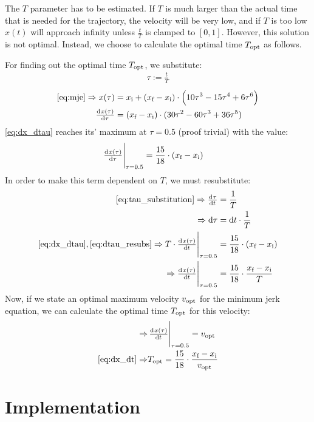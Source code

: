 \documentclass[11pt]{article}
\begin{document}
The $T$ parameter has to be estimated. If $T$ is much larger than  the actual time that is needed for the trajectory, the velocity will be very low, and if $T$ is too low $x(t)$ will approach infinity unless $\frac{t}{T}$ is clamped to $[0,1]$. However, this solution is not optimal. Instead, we choose to calculate the optimal time $T_\textup{opt}$ as follows.%
\par
For finding out the optimal time $T_\textup{opt}$, we substitute:
\begin{align}
  \label{eq:tau_substitution}
  \tau:=\frac{t}{T}
\end{align}
\begin{align}
\ref{eq:mje}\Rightarrow x(\tau)&= \di{x}{i} +  (\di{x}{f} - \di{x}{i}) \cdot \left(10\tau^3 - 15\tau^4 + 6\tau^6 \right)\\
\od{x(\tau)}{\tau}&= (\di{x}{f} - \di{x}{i})\cdot(30\tau^2-60\tau^3+36\tau^5)\label{eq:dx_dtau}
\end{align}
\ref{eq:dx_dtau} reaches its' maximum at $\tau=0.5$ (proof trivial) with the value:
\begin{align}
  \eval{\od{x(\tau)}{\tau}}_{\tau=0.5}&=\frac{15}{18}\cdot(\di{x}{f} - \di{x}{i})
\end{align}
In order to make this term dependent on $T$, we must resubstitute:
\begin{align}
  \ref{eq:tau_substitution}\Rightarrow \od{\tau}{t}&=\frac{1}{T}\\
  \Rightarrow\dif\tau&=\dif t\cdot\frac{1}{T}\label{eq:dtau_resubs}\\
  \ref{eq:dx_dtau},\ref{eq:dtau_resubs}\Rightarrow\eval{T\cdot\od{x(\tau)}{t}}_{\tau=0.5}&=\frac{15}{18}\cdot(\di{x}{f} - \di{x}{i})\\
  \Rightarrow\eval{\od{x(\tau)}{t}}_{\tau=0.5}&=\frac{15}{18}\cdot\frac{\di{x}{f} - \di{x}{i}}{T}\label{eq:dx_dt}
\end{align}
Now, if we state an optimal maximum velocity $v_\textup{opt}$ for the minimum jerk equation, we can calculate the optimal time $T_\textup{opt}$ for this velocity:
\begin{align}
  \Rightarrow&\eval{\od{x(\tau)}{t}}_{\tau=0.5}=\di{v}{opt}\\
  \ref{eq:dx_dt}\Rightarrow& \di{T}{opt}=\frac{15}{18}\cdot\frac{\di{x}{f} - \di{x}{i}}{\di{v}{opt}}
\end{align}
\par

\section{Implementation}
\end{document}
